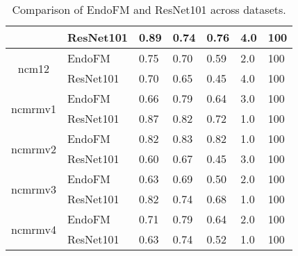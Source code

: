 \begin{table}[h]
\begin{tabular}{cllllll}
     & ResNet101 & 0.89 & 0.74 & 0.76 & 4.0 & 100 \\
    \midrule
    \multirow{2}{*}{ncm12}
 & EndoFM & 0.75 & 0.70 & 0.59 & 2.0 & 100 \\
     & ResNet101 & 0.70 & 0.65 & 0.45 & 4.0 & 100 \\
    \midrule
    \multirow{2}{*}{ncmrmv1}
 & EndoFM & 0.66 & 0.79 & 0.64 & 3.0 & 100 \\
     & ResNet101 & 0.87 & 0.82 & 0.72 & 1.0 & 100 \\
    \midrule
    \multirow{2}{*}{ncmrmv2}
 & EndoFM & 0.82 & 0.83 & 0.82 & 1.0 & 100 \\
     & ResNet101 & 0.60 & 0.67 & 0.45 & 3.0 & 100 \\
    \midrule
    \multirow{2}{*}{ncmrmv3}
 & EndoFM & 0.63 & 0.69 & 0.50 & 2.0 & 100 \\
     & ResNet101 & 0.82 & 0.74 & 0.68 & 1.0 & 100 \\
    \midrule
    \multirow{2}{*}{ncmrmv4}
 & EndoFM & 0.71 & 0.79 & 0.64 & 2.0 & 100 \\
     & ResNet101 & 0.63 & 0.74 & 0.52 & 1.0 & 100 \\
    \midrule
    \bottomrule
    \end{tabular}
    \vspace{-0.1in}
    \caption{Comparison of EndoFM and ResNet101 across datasets.}
    \label{tab:performance_comparison}
\end{table}

